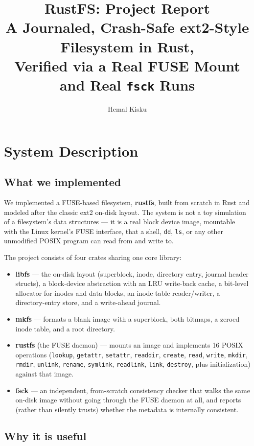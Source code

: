 \documentclass[11pt]{article}
\title{\textbf{RustFS: Project Report}\\
\large A Journaled, Crash-Safe ext2-Style Filesystem in Rust,\\
Verified via a Real FUSE Mount and Real \texttt{fsck} Runs}
\author{Hemal Kisku}
\date{}
\begin{document}
\maketitle

\section{System Description}

\subsection{What we implemented}

We implemented a FUSE-based filesystem, \textbf{rustfs}, built from scratch in Rust and modeled
after the classic ext2 on-disk layout. The system is not a toy simulation of a filesystem's data
structures — it is a real block device image, mountable with the Linux kernel's FUSE interface,
that a shell, \texttt{dd}, \texttt{ls}, or any other unmodified POSIX program can read from and
write to.

The project consists of four crates sharing one core library:
\begin{itemize}
    \item \textbf{libfs} — the on-disk layout (superblock, inode, directory entry, journal header
    structs), a block-device abstraction with an LRU write-back cache, a bit-level allocator for
    inodes and data blocks, an inode table reader/writer, a directory-entry store, and a
    write-ahead journal.
    \item \textbf{mkfs} — formats a blank image with a superblock, both bitmaps, a zeroed inode
    table, and a root directory.
    \item \textbf{rustfs} (the FUSE daemon) — mounts an image and implements 16 POSIX operations
    (\texttt{lookup}, \texttt{getattr}, \texttt{setattr}, \texttt{readdir}, \texttt{create},
    \texttt{read}, \texttt{write}, \texttt{mkdir}, \texttt{rmdir}, \texttt{unlink},
    \texttt{rename}, \texttt{symlink}, \texttt{readlink}, \texttt{link}, \texttt{destroy}, plus
    initialization) against that image.
    \item \textbf{fsck} — an independent, from-scratch consistency checker that walks the same
    on-disk image without going through the FUSE daemon at all, and reports (rather than silently
    trusts) whether the metadata is internally consistent.
\end{itemize}

\subsection{Why it is useful}
\end{document}
